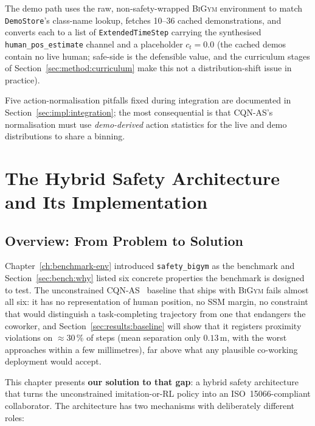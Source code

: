 \documentclass[11pt,a4paper]{report}
\newcommand{\ssm}{SSM}
\newcommand{\iso}{ISO~15066}
\newcommand{\bigym}{\textsc{BiGym}}
\newcommand{\sbigym}{\texttt{safety\_bigym}}
\newcommand{\cqnas}{CQN-AS}
\begin{document}
The demo path uses the raw, non-safety-wrapped \bigym{}
environment to match \texttt{DemoStore}'s class-name lookup,
fetches 10--36 cached demonstrations, and converts each to a list of
\texttt{ExtendedTimeStep} carrying the synthesised
\texttt{human\_pos\_estimate} channel and a placeholder $c_t = 0.0$
(the cached demos contain no live human; safe-side is the
defensible value, and the curriculum stages of
Section~\ref{sec:method:curriculum} make this not a
distribution-shift issue in practice).

Five action-normalisation pitfalls fixed during integration are
documented in Section~\ref{sec:impl:integration}; the most consequential is
that \cqnas{}'s normalisation must use \emph{demo-derived} action
statistics for the live and demo distributions to share a binning.

\chapter{The Hybrid Safety Architecture and Its Implementation}
\label{ch:method}

\section{Overview: From Problem to Solution}
\label{sec:method:overview}

Chapter~\ref{ch:benchmark-env} introduced \sbigym{} as the
benchmark and Section~\ref{sec:bench:why} listed six concrete
properties the benchmark is designed to test. The unconstrained
\cqnas{}~\cite{seo2024cqnas} baseline that ships with \bigym{}
fails almost all six: it has no representation of human position,
no \ssm{} margin, no constraint that would distinguish a
task-completing trajectory from one that endangers the coworker,
and Section~\ref{sec:results:baseline} will show that it registers
proximity violations on $\approx$30\,\% of steps (mean separation only
$0.13$\,m, with the worst approaches within a few millimetres), far
above what any plausible co-working deployment would accept.

This chapter presents \textbf{our solution to that gap}: a hybrid
safety architecture that turns the unconstrained
imitation-or-RL policy into an \iso{}-compliant collaborator. The
architecture has two mechanisms with deliberately different roles:
\end{document}

